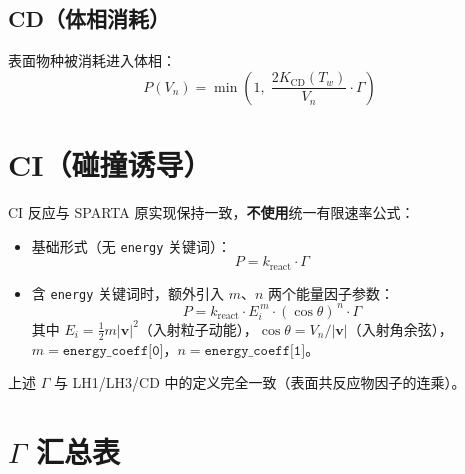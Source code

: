 \documentclass[12pt,a4paper]{article}
\begin{document}
\subsection{CD（体相消耗）}
表面物种被消耗进入体相：
\begin{equation}
  P(V_n) = \min\!\left(1,\; \frac{2 K_{\text{CD}}(T_w)}{V_n} \cdot \Gamma\right)
\end{equation}

\section{CI（碰撞诱导）}\label{sec:ci}

CI 反应与 SPARTA 原实现保持一致，\textbf{不使用}统一有限速率公式：

\begin{itemize}
  \item 基础形式（无 \texttt{energy} 关键词）：
  \begin{equation}
    P = k_{\text{react}} \cdot \Gamma
  \end{equation}

  \item 含 \texttt{energy} 关键词时，额外引入 $m$、$n$ 两个能量因子参数：
  \begin{equation}
    P = k_{\text{react}} \cdot E_i^{\,m} \cdot (\cos\theta)^{\,n} \cdot \Gamma
  \end{equation}
  其中 $E_i = \frac{1}{2}m|\mathbf{v}|^2$（入射粒子动能），$\cos\theta = V_n / |\mathbf{v}|$（入射角余弦），\\
  $m = \texttt{energy\_coeff[0]}$，$n = \texttt{energy\_coeff[1]}$。
\end{itemize}

上述 $\Gamma$ 与 LH1/LH3/CD 中的定义完全一致（表面共反应物因子的连乘）。

\section{$\Gamma$ 汇总表}
\end{document}
